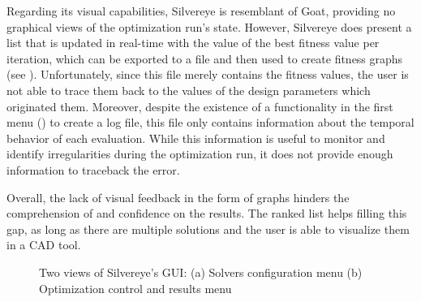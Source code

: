 Regarding its visual capabilities, Silvereye is resemblant of Goat, providing no graphical views of the optimization run's state. However, Silvereye does present a list that is updated in real-time with the value of the best fitness value per iteration, which can be exported to a file and then used to create fitness graphs (see ). Unfortunately, since this file merely contains the fitness values, the user is not able to trace them back to the values of the design parameters which originated them. Moreover, despite the existence of a functionality in the first menu () to create a log file, this file only contains information about the temporal behavior of each evaluation. While this information is useful to monitor and identify irregularities during the optimization run, it does not provide enough information to traceback the error. 

Overall, the lack of visual feedback in the form of graphs hinders the comprehension of and confidence on the results. The ranked list helps filling this gap, as long as there are multiple solutions and the user is able to visualize them in a \ac{CAD} tool.

\begin{figure}[htbp]
	\centering
	\hfill
	
	\caption[Silvereye GUI]{Two views of Silvereye's \ac{GUI}: (a) Solvers configuration menu (b) Optimization control and results menu}
	\label{fig:silvereye}
\end{figure}

